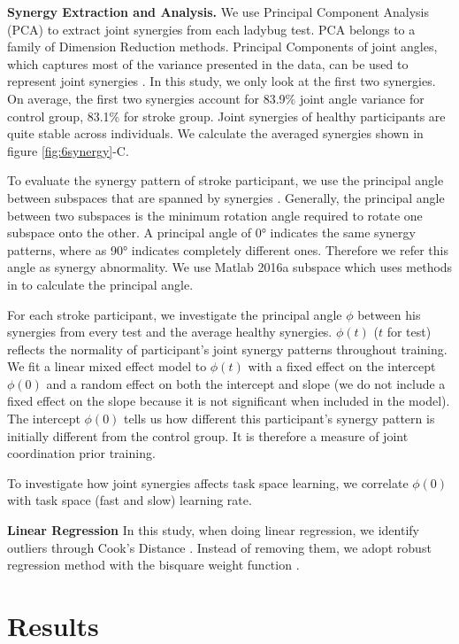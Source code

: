 \textbf{Synergy Extraction and Analysis.}
We use Principal Component Analysis (PCA) to extract joint synergies from each ladybug test.
PCA belongs to a family of Dimension Reduction methods.
Principal Components of joint angles, which captures most of the variance presented in the data, can be used to represent joint synergies \cite{}.
In this study, we only look at the first two synergies.
On average, the first two synergies account for 83.9\% joint angle variance for control group, 83.1\% for stroke group.
Joint synergies of healthy participants are quite stable across individuals.
We calculate the averaged synergies shown in figure \ref{fig:6synergy}-C.

To evaluate the synergy pattern of stroke participant, we use the principal angle \cite{} between subspaces that are spanned by synergies \cite{}.
Generally, the principal angle between two subspaces is the minimum rotation angle required to rotate one subspace onto the other.
A principal angle of \ang{0} indicates the same synergy patterns, where as \ang{90} indicates completely different ones.
Therefore we refer this angle as synergy abnormality.
We use Matlab 2016a \textsf{subspace} which uses methods in \cite{} to calculate the principal angle. 

For each stroke participant, we investigate the principal angle $ \phi $ between his synergies from every test and the average healthy synergies.
$ \phi(t) $ ($ t $ for test) reflects the normality of participant's joint synergy patterns throughout training. 
We fit a linear mixed effect model to $ \phi(t) $ with a fixed effect on the intercept $ \phi(0) $ and a random effect on both the intercept and slope (we do not include a fixed effect on the slope because it is not significant when included in the model).
The intercept $ \phi(0) $ tells us how different this participant's synergy pattern is initially different from the control group.
It is therefore a measure of joint coordination prior training.

To investigate how joint synergies affects task space learning, we correlate $ \phi(0) $ with task space (fast and slow) learning rate.

\textbf{Linear Regression}
In this study, when doing linear regression, we identify outliers through Cook's Distance \cite{}.
Instead of removing them, we adopt robust regression method with the bisquare weight function \cite{}.

\section{Results}

